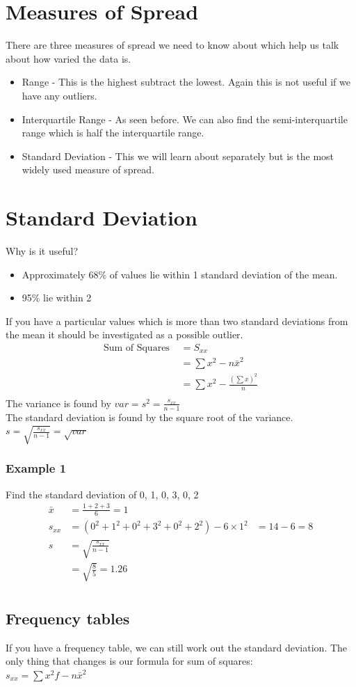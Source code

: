 \documentclass[a4paper,12pt]{article}
\begin{document}
\section*{Measures of Spread}
There are three measures of spread we need to know about which help us talk about how varied the data is.
\begin{itemize}
	\item Range - This is the highest subtract the lowest. Again this is not useful if we have any outliers.
	\item Interquartile Range - As seen before. We can also find the semi-interquartile range which is half the interquartile range.
	\item Standard Deviation - This we will learn about separately but is the most widely used measure of spread.   
\end{itemize}

\section*{Standard Deviation}
Why is it useful?
\begin{itemize}
	\item Approximately 68\% of values lie within 1 standard deviation of the mean. 
	\item 95\% lie within 2
\end{itemize}
If you have a particular values which is more than two standard deviations from the mean it should be investigated as a possible outlier. \\
\begin{align*}
\text{Sum of Squares } & = S_{xx} \\ 
& = \sum x^2 - n\bar{x}^2 \\
& = \sum x^2 - \frac{(\sum x)^2}{n} \\
\end{align*}
The variance is found by $var = s^2 = \frac{s_{xx}}{n-1}$ \\
The standard deviation is found by the square root of the variance. \\
$s = \sqrt{\frac{s_{xx}}{n-1}} = \sqrt{var}$

\subsubsection*{Example 1}
Find the standard deviation of 0, 1, 0, 3, 0, 2
\begin{align*}
\bar{x} & = \frac{1 + 2 + 3}{6} = 1 \\
s_{xx} & = (0^2 + 1^2 + 0^2 + 3^2 + 0^2 + 2^2) - 6 \times 1^2
& = 14-6 = 8 \\
s & = \sqrt{\frac{s_{xx}}{n-1}} \\
& = \sqrt{\frac{8}{5}} = 1.26 \\
\end{align*}

\subsection*{Frequency tables}
If you have a frequency table, we can still work out the standard deviation. The only thing that changes is our formula for sum of squares: \\
$s_{xx} = \sum x^2f - n\bar{x}^2$ \\
\end{document}
